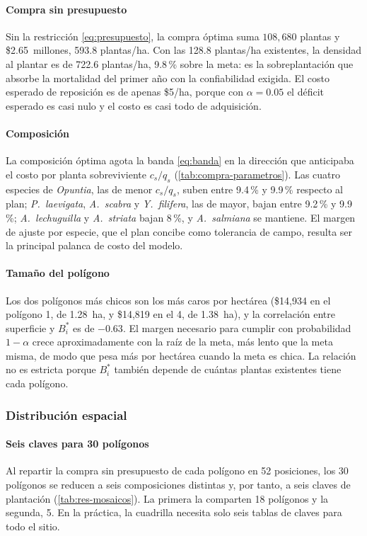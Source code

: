 \paragraph{Compra sin presupuesto} Sin la restricción \eqref{eq:presupuesto}, la compra óptima suma $108{,}680$ plantas y \$2.65~millones, 593.8 plantas/ha. Con las 128.8 plantas/ha existentes, la densidad al plantar es de 722.6 plantas/ha, 9.8\,\% sobre la meta: es la sobreplantación que absorbe la mortalidad del primer año con la confiabilidad exigida. El costo esperado de reposición es de apenas \$5/ha, porque con $\alpha=0.05$ el déficit esperado es casi nulo y el costo es casi todo de adquisición.

\paragraph{Composición} La composición óptima agota la banda \eqref{eq:banda} en la dirección que anticipaba el costo por planta sobreviviente $c_s/q_s$ (\cref{tab:compra-parametros}). Las cuatro especies de \textit{Opuntia}, las de menor $c_s/q_s$, suben entre 9.4\,\% y 9.9\,\% respecto al plan; \textit{P.~laevigata}, \textit{A.~scabra} y \textit{Y.~filifera}, las de mayor, bajan entre 9.2\,\% y 9.9\,\%; \textit{A.~lechuguilla} y \textit{A.~striata} bajan 8\,\%, y \textit{A.~salmiana} se mantiene. El margen de ajuste por especie, que el plan concibe como tolerancia de campo, resulta ser la principal palanca de costo del modelo.

\paragraph{Tamaño del polígono} Los dos polígonos más chicos son los más caros por hectárea (\$14{,}934 en el polígono 1, de 1.28~ha, y \$14{,}819 en el 4, de 1.38~ha), y la correlación entre superficie y $B_i^{*}$ es de $-0.63$. El margen necesario para cumplir con probabilidad $1-\alpha$ crece aproximadamente con la raíz de la meta, más lento que la meta misma, de modo que pesa más por hectárea cuando la meta es chica. La relación no es estricta porque $B_i^{*}$ también depende de cuántas plantas existentes tiene cada polígono.

\subsubsection{Distribución espacial}
\label{subsec:res-espacial}

\paragraph{Seis claves para 30 polígonos} Al repartir la compra sin presupuesto de cada polígono en 52 posiciones, los 30 polígonos se reducen a seis composiciones distintas y, por tanto, a seis claves de plantación (\cref{tab:res-mosaicos}). La primera la comparten 18 polígonos y la segunda, 5. En la práctica, la cuadrilla necesita solo seis tablas de claves para todo el sitio.

